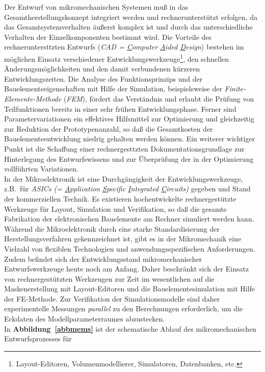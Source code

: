 Der Entwurf von mikromechanischen Systemen muß in das
Gesamtherstellungskonzept integriert werden und rechnerunterstützt
erfolgen, da das Gesamtsystemverhalten äußerst komplex ist und durch das
unterschiedliche Verhalten der Einzelkomponenten bestimmt wird. Die
Vorteile des rechneruntersttzten Entwurfs ({\em CAD = \underline{C}omputer
\underline{A}ided \underline{D}esign}) bestehen im möglichen Einsatz
verschiedener Entwicklungswerkzeuge\footnote{Layout-Editoren,
Volumenmodellierer, Simulatoren, Datenbanken, etc.},
den schnellen Änderungsmöglichkeiten
und den damit verbundenen kürzeren Entwicklungszeiten. Die Analyse des
Funktionsprinzips und der Bauelementeeigenschaften mit Hilfe der Simulation,
beispielsweise der {\em Finite-Elemente-Methode} ({\em FEM}), fördert das
Verständnis und erlaubt die Prüfung von Teilfunktionen bereits
in einer sehr frühen Entwicklungsphase. Ferner sind Parametervariationen
ein effektives Hilfsmittel zur Optimierung und gleichzeitig zur
Reduktion der Proto\-typenanzahl, so daß die Gesamtkosten der
Bauelementeentwicklung niedrig gehalten werden können. Ein weiterer
wichtiger Punkt ist die Schaffung einer rechnergesttzten
Dokumentationsgrundlage zur Hinterlegung des Entwurfswissens und zur
Überprüfung der in der Optimierung vollführten Variationen.\\
In der Mikroelektronik ist eine
Durchgängigkeit der Entwicklungswerkzeuge, z.B.\ für {\em ASICs (=
\underline{A}pplication \underline{S}pecific \underline{I}ntegrated
\underline{C}ircuits)} gegeben und Stand der kommerziellen
Technik.  Es existieren hochentwickelte rechnergestützte Werkzeuge für
Layout, Simulation und Verifikation, so daß die gesamte Fabrikation der
elektronischen Bauelemente am Rechner simuliert werden kann. Während
die Mikroelektronik durch eine starke Standardisierung der
Herstellungsverfahren gekennzeichnet ist, gibt es in der Mikromechanik
eine Vielzahl von flexiblen Technologien und anwendungsspezifischen
Anforderungen. Zudem befindet sich der Entwicklungsstand mikromechanischer
Entwurfswerkzeuge heute noch am Anfang. Daher beschränkt sich der
Einsatz von rechnergestützten Werkzeugen zur Zeit im
wesentlichen auf die Maskenerstellung mit Layout-Editoren und die
Bauelemente\-simulation mit Hilfe der FE-Methode. Zur Verifikation der
Simulationsmodelle sind daher experimentelle Messungen {\em parallel}
zu den Berechnungen erforderlich, um die Eckdaten des Modellparameterraumes
abzustecken.\\
%
In {\bf Abbildung~\ref{abbmems}} ist der schematische Ablauf des
mikromechanischen Entwurfsprozesses für
